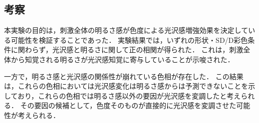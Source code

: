         \subsection{考察}
        
            本実験の目的は，刺激全体の明るさ感が色度による光沢感増強効果を決定している可能性を検証することであった．
            実験結果では，いずれの形状・SD/D彩色条件に関わらず，光沢感と明るさに関して正の相関が得られた．
            これは，刺激全体から知覚される明るさが光沢感知覚に寄与していることが示唆された．

            一方で，明るさ感と光沢感の関係性が崩れている色相が存在した．
            この結果は，これらの色相においては光沢感変化は明るさ感からは予測できないことを示しており，これらの色相では明るさ感以外の要因が光沢感を変調したと考えられる．
            その要因の候補として，色度そのものが直接的に光沢感を変調させた可能性が考えられる．

    \newpage